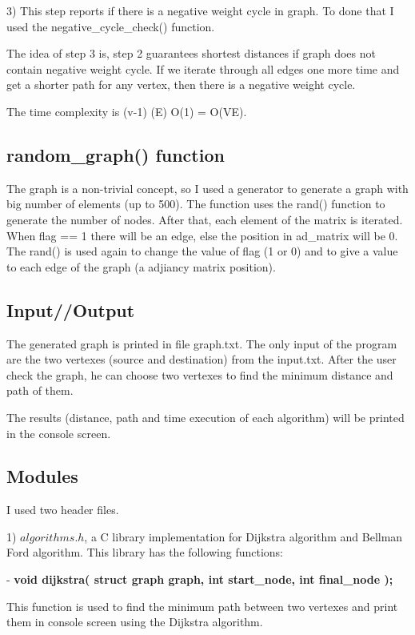 \documentclass[12]{article}
\begin{document}
3) This step reports if there is a negative weight cycle in graph. To done that I used the negative\_cycle\_check() function.

The idea of step 3 is, step 2 guarantees shortest distances if graph does not contain negative weight cycle. If we iterate through all edges one more time and get a shorter path for any vertex, then there is a negative weight cycle.

The time complexity is (v-1) (E) O(1) = O(VE).

\subsection{random\_graph() function}
\textbf{}

The graph is a non-trivial concept, so I used a generator to generate a graph with big number of elements (up to 500). The function uses the rand() function to generate the number of nodes. After that, each element of the matrix is iterated. When flag == 1 there will be an edge, else the position in ad\_matrix will be 0. The rand() is used again to change the value of flag (1 or 0) and to give a value to each edge of the graph (a adjiancy matrix position). 

\subsection{Input//Output}
\textbf{}

The generated graph is printed in  file graph.txt. The only input of the program are the two vertexes (source and destination) from the input.txt. After the user check the graph, he can choose two vertexes to find the minimum distance and path of them. 

The results (distance, path and time execution of each algorithm) will be printed in the console screen. 

\subsection{Modules}
\textbf{}

I used two header files.


1) $algorithms.h$, a C library implementation for Dijkstra algorithm and Bellman Ford algorithm. This library has the following functions:

- \textbf{void dijkstra( struct graph graph, int start\_node, int final\_node );}

This function is used to find the minimum path between two vertexes and print them in console screen using the Dijkstra algorithm.
\end{document}
